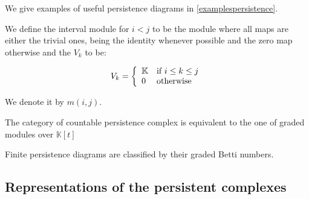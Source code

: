 We give examples of useful persistence diagrams in \ref{examplespersistence}.

\begin{example}
We define the interval module for $i<j$
to be the module where all maps are either the trivial ones, 
being the identity whenever possible and the zero map otherwise and 
the $V_k$ to be:

$$
V_k
=
\left\{
\begin{array}{l l}
\mathbb{K} & \text{if } i\leq k\leq j\\
0 & \text{otherwise} 
\end{array}
\right.
$$


We denote it by $m(i,j)$.

\end{example}



\begin{proposition}\cite{zomcar2002}
The category of countable persistence complex is equivalent to the one of graded modules over
$\mathbb{K}[t]$
\end{proposition}

\begin{proposition}\cite{zomcar2002}
Finite persistence diagrams are classified by 
their graded Betti numbers.

\end{proposition}


\subsection{Representations of the persistent complexes}

%


\begin{definition}

\end{definition}

%
%



